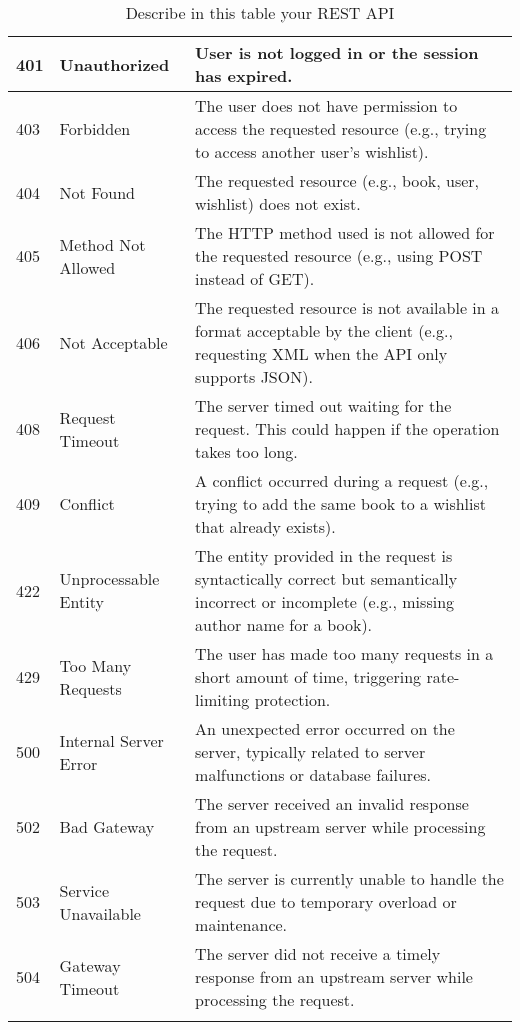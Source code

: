 \begin{longtable}{|p{}|p{} |p{}|}
\hline
401 & Unauthorized & User is not logged in or the session has expired. \\
\hline
403 & Forbidden & The user does not have permission to access the requested resource (e.g., trying to access another user's wishlist). \\
\hline
404 & Not Found & The requested resource (e.g., book, user, wishlist) does not exist. \\
\hline
405 & Method Not Allowed & The HTTP method used is not allowed for the requested resource (e.g., using POST instead of GET). \\
\hline
406 & Not Acceptable & The requested resource is not available in a format acceptable by the client (e.g., requesting XML when the API only supports JSON). \\
\hline
408 & Request Timeout & The server timed out waiting for the request. This could happen if the operation takes too long. \\
\hline
409 & Conflict & A conflict occurred during a request (e.g., trying to add the same book to a wishlist that already exists). \\
\hline
422 & Unprocessable Entity & The entity provided in the request is syntactically correct but semantically incorrect or incomplete (e.g., missing author name for a book). \\
\hline
429 & Too Many Requests & The user has made too many requests in a short amount of time, triggering rate-limiting protection. \\
\hline
500 & Internal Server Error & An unexpected error occurred on the server, typically related to server malfunctions or database failures. \\
\hline
502 & Bad Gateway & The server received an invalid response from an upstream server while processing the request. \\
\hline
503 & Service Unavailable & The server is currently unable to handle the request due to temporary overload or maintenance. \\
\hline
504 & Gateway Timeout & The server did not receive a timely response from an upstream server while processing the request.
\\\hline
\caption{Describe in this table your REST API}
\label{tab:termGlossary}
\end{longtable}